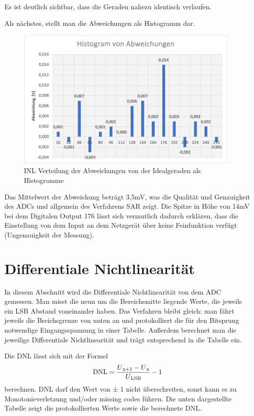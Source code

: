 Es ist deutlich sichtbar, dass die Geraden nahezu identisch verlaufen.\par

Als nächstes, stellt man die Abweichungen als Histogramm dar. 

\begin{figure}[H]
	\centering
	\includegraphics[height=7cm]{images/Histogramm_versuch1.png} 
	\caption[]{INL Verteilung der Abweichungen von der
	Idealgeraden als Histogramme}
	\label{fig: INL Verteilung der Abweichungen von der
	Idealgeraden als Histogramme}
\end{figure}

Das Mittelwert der Abweichung beträgt 3,5mV, was die Qualität und Genauigkeit
des ADCs und allgemein des Verfahrens SAR zeigt.
Die Spitze in Höhe von 14mV bei dem Digitalen Output 176 lässt sich vermutlich 
dadurch erklären, dass die Einstellung von dem Input an dem Netzgerät über keine 
Feinfunktion verfügt (Ungenauigkeit der Messung).

\section{Differentiale Nichtlinearität}
In diesem Abschnitt wird die Differentiale Nichtlinearität von dem ADC gemessen.
Man misst die neun um die Bereichsmitte liegende Werte, die jeweils ein LSB Abstand
voneinander haben. Das Verfahren bleibt gleich: man fährt jeweils die Breichsgrenze 
von unten an und protokolliert die für den Bitsprung notwendige Eingangsspannung in 
einer Tabelle. Außerdem berechnet man die jeweilige Differentiale Nichtlinearität und
trägt entsprechend in die Tabelle ein.

Die DNL lässt sich mit der Formel 
\[
\text{DNL} = \frac{U\textsubscript{x+1} - U\textsubscript{x}}{U\textsubscript{LSB}} - 1
\]
berechnen. DNL darf den Wert von ± 1 nicht überschreiten, sonst kann es zu 
Monotonieverletzung und/oder missing codes führen. Die unten dargestellte Tabelle
zeigt die protokollierten Werte sowie die berechnete DNL.

